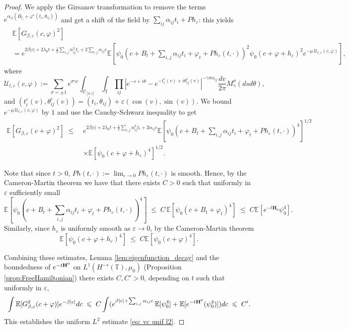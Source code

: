\documentclass[11pt]{amsart}
\numberwithin{equation}{section}
\theoremstyle{definition}
\renewcommand{\leq}{\;\leqslant\;}                   %
\renewcommand{\H}{\mathbb{H}}
\def\H{\mathbf{H}}
\def\E{\mathbb{E}}
\def\eps{\varepsilon}
\def\T{\mathbb{T}}
\begin{document}
\begin{proof}
We apply the Girsanov transformation to remove the terms $e^{\alpha_{ij}(B_{t_i}+\varphi^\eps(t_i,\theta_{ij}))}$ 
and get a shift of the field by $\sum_{ij} \alpha_{ij} t_i+Ph_\eps$: this yields
\begin{align*}
& \mathbb{E}[G_{\beta,\eps}(c,\varphi)^2]\\
& =
e^{2\beta|c|+2\lambda_0 t+\frac{1}{2}\sum_{i,j}\alpha_{ij}^2t_i+2\sum_{i,j} \alpha_{ij} c } \mathbb E [ \psi_0(c+B_t + \sum_{i,j} \alpha_{ij} t_i+ \varphi_t + Ph_\eps(t,\cdot))^2 \psi_0(c+\varphi+h_\eps)^2 e^{-\mu \, \mathcal{U}_{t,\eps} (c,\varphi)}],
\end{align*}
where 
\begin{equation}
\mathcal{U}_{t,\eps}(c,\varphi)
:=
\sum_{\sigma = \pm 1} e^{\sigma\gamma c} \int_{\mathcal{C}_{[0,t]}} \int_{\mathbb{T}} \prod_{ij} |e^{-s+i\theta}-e^{-t_i^{\eps}(v)+i\theta_{ij}^{\eps}(v)}|^{-\gamma \sigma \alpha_{ij}} \frac{dv}{2\pi} M^\sigma_\gamma(dsd\theta),
\end{equation}
and $(t_i^\eps(v), \theta_{ij}^\eps(v)) = (t_i,\theta_{ij}) + \eps(\cos(v),\sin(v)) $.
We bound $e^{-\mu \, \mathcal{U}_{t,\eps} (c,\varphi)}$ by $1$ and use the Cauchy-Schwarz inequality to get
 \[\begin{split}
 \mathbb{E}[G_{\beta,\eps}(c+\varphi)^2]
\leq & e^{2\beta|c|+2\lambda_0 t+\frac{1}{2}\sum_{i,j}\alpha_{ij}^2t_i+2\alpha_{ij} c }  \E [ \psi_0(c+B_t + \sum_{i,j} \alpha_{ij} t_i+ \varphi_t + Ph_\eps(t,\cdot))^4]^{1/2} \\
& \times \E[\psi_0(c+\varphi+h_\eps)^4]^{1/2}. 
\end{split}\]

Note that since $t>0$, $Ph(t,\cdot):=\lim_{\eps \rightarrow 0} Ph_\eps(t,\cdot)$ is smooth. Hence, by the Cameron-Martin theorem we have that there exists $C>0$ such that uniformly in $\eps$ sufficiently small
\begin{equation} \label{eq: vc 1}
\mathbb{E}[\psi_0(c+B_t + \sum_{i,j} \alpha_{ij} t_i+ \varphi_t + Ph_\eps(t,\cdot))^4]
\leq
C \,  \mathbb{E}[\psi_0(c+B_t+ \varphi_t)^4] \leq C\E [e^{-t\H_0}\psi_0^4]. 	
\end{equation}
Similarly, since $h_\eps$ is uniformly smooth as $\eps\to 0$, by the Cameron-Martin theorem
\[ \E[\psi_0(c+\varphi+h_\eps)^4]  \leq C \E[\psi_0(c+\varphi)^4].\]

Combining these estimates, Lemma \ref{lem:eigenfunction_decay} and the boundedness of $e^{-t{\bf H}^0}$ on 
$L^1(H^{-s}(\T),\mu_0)$ (Proposition \ref{prop:FreeHamiltonian})
there exists $C,C'>0$, depending on $t$  such that uniformly in $\eps$,
\begin{equation}
\int \mathbb E [G_{\beta,\eps}^2(c+\varphi)] e^{-\beta|c|}dc
\leq C \int (e^{\beta|c|+\sum_{i,j}\alpha_{ij} c} \, \mathbb{E}[\psi_0^{4}]+ \E[e^{-t{\bf H}^0}(\psi_0^{4})]) dc\leq C'.
\end{equation}
This establishes the uniform $L^2$ estimate \eqref{eq: vc unif l2}.


\end{proof}
\end{document}
